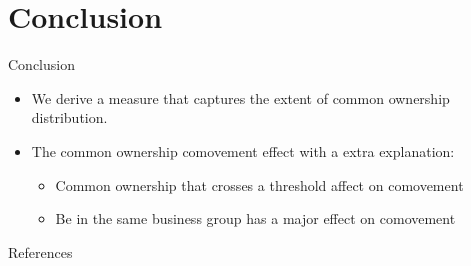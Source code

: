 \documentclass{beamer}
\begin{document}
	
	
	\section{Conclusion}
	
	\begin{frame}{Conclusion}
		\begin{itemize}
			
			\item We derive a measure that captures the extent of common ownership distribution.
			
			
			\item The common ownership comovement effect  with a
			extra explanation:
			\begin{itemize}
				\item Common ownership that  crosses a threshold affect on comovement
				\item Be in the same business group has a major effect on comovement
			\end{itemize} 
		\end{itemize}
	\end{frame}
	
	\tiny
	\begin{frame}[allowframebreaks]{References}
		
		{		
			
			
		}
	\end{frame}
	
	\normalsize
	
	
	\color{black}
	\appendix
	
	
	
	
	
	
\end{document}
